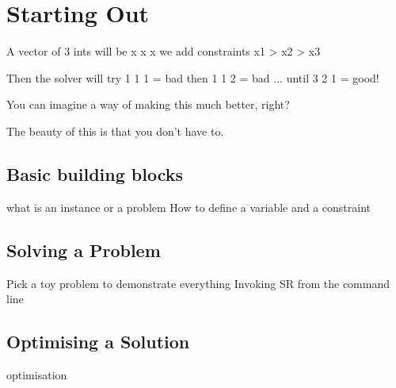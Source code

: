 \section{Starting Out}


A vector of 3 ints will be x x x
we add constraints x1 > x2 > x3

Then the solver will try 1 1 1 = bad
then 1 1 2 = bad ...
until 3 2 1 = good!

You can imagine a way of making this much better, right?

The beauty of this is that you don't have to.


\subsection{Basic building blocks}
 what is an instance or a problem
How to define a variable and a constraint

\subsection{Solving a Problem}
Pick a toy problem to demonstrate everything
Invoking SR from the command line

\subsection{Optimising a Solution}
optimisation
